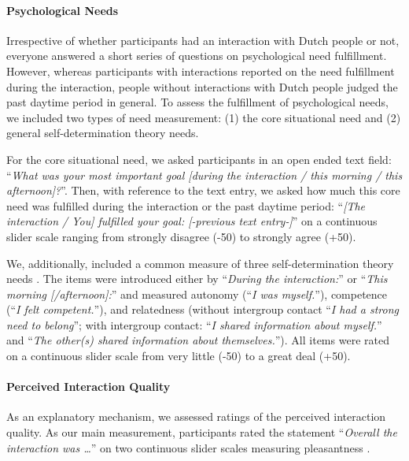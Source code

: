 \paragraph{Psychological Needs}

Irrespective of whether participants had an interaction with Dutch
people or not, everyone answered a short series of questions on
psychological need fulfillment. However, whereas participants with
interactions reported on the need fulfillment during the interaction,
people without interactions with Dutch people judged the past daytime
period in general. To assess the fulfillment of psychological needs, we
included two types of need measurement: (1) the core situational need
and (2) general self-determination theory needs.

For the core situational need, we asked participants in an open ended
text field:
``\textit{What was your most important goal [during the interaction / this morning / this afternoon]?}''.
Then, with reference to the text entry, we asked how much this core need
was fulfilled during the interaction or the past daytime period:
``\textit{[The interaction / You] fulfilled your goal: [-previous text entry-]}''
on a continuous slider scale ranging from strongly disagree (-50) to
strongly agree (+50).

We, additionally, included a common measure of three self-determination
theory needs \citep[see][]{Downie2008}. The items were introduced either
by ``\textit{During the interaction:}'' or
``\textit{This morning [/afternoon]:}'' and measured autonomy
(``\textit{I was myself.}''), competence
(``\textit{I felt competent.}''), and relatedness (without intergroup
contact ``\textit{I had a strong need to belong}''; with intergroup
contact: ``\textit{I shared information about myself.}'' and
``\textit{The other(s) shared information about themselves.}''). All
items were rated on a continuous slider scale from very little (-50) to
a great deal (+50).

\paragraph{Perceived Interaction Quality}

As an explanatory mechanism, we assessed ratings of the perceived
interaction quality. As our main measurement, participants rated the
statement ``\textit{Overall the interaction was …}'' on two continuous
slider scales measuring pleasantness
\citep[from unpleasant (-50) to pleasant (+50)) and meaningfulness (from superficial (-50) to meaningful (+50); both items adapted from][]{Downie2008}.

